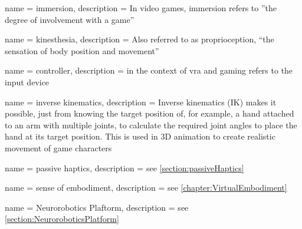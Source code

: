 












{
    name = immersion,
    description = {In video games, immersion refers to ''the degree of involvement with a game'' \autocite[p. ~2]{gameImmersion}}
}

{
    name = kinesthesia,
    description = {Also referred to as proprioception, \enquote{the sensation of body position and movement}\autocite{proprioception}}
}

{
    name = controller,
    description = {in the context of \gls{vra} and gaming refers to the input device}
}

{
    name = {inverse kinematics},
    description = {Inverse kinematics (IK) makes it possible, just from knowing the target position of, for example, a hand attached to an arm with multiple joints, to calculate the required joint angles to place the hand at its target position. This is used in 3D animation to create realistic movement of game characters \autocite[p. ~3f]{bodyTrackingVR}}
}

{
    name = {passive haptics},
    description = {see \autoref{section:passiveHaptics}}
}

{
    name = {sense of embodiment},
    description = {see \autoref{chapter:VirtualEmbodiment}}
}

{
    name = Neurorobotics Plaftorm,
    description = {see \autoref{section:NeuroroboticsPlatform}}
}


